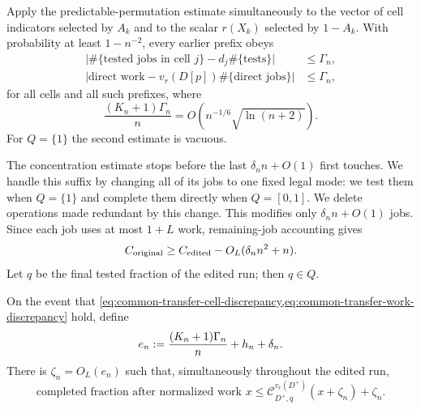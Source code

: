 Apply the predictable-permutation estimate simultaneously to the vector of
cell indicators selected by $A_k$ and to the scalar $r(X_k)$ selected by
$1-A_k$.  With probability at least $1-n^{-2}$, every earlier prefix obeys
\begin{align}
 \bigl|\#\{\text{tested jobs in cell }j\}
      -d_j\#\{\text{tests}\}\bigr|&\le\Gamma_n,
 \label{eq:common-transfer-cell-discrepancy}\\
 \bigl|\text{direct work}
      -v_r(D[p])\#\{\text{direct jobs}\}\bigr|&\le\Gamma_n,
 \label{eq:common-transfer-work-discrepancy}
\end{align}
for all cells and all such prefixes, where
\begin{equation}
 \frac{(K_n+1)\Gamma_n}{n}
 =O\!\left(n^{-1/6}\sqrt{\ln(n+2)}\right).
 \label{eq:common-transfer-discrepancy-rate}
\end{equation}
For $Q=\{1\}$ the second estimate is vacuous.

The concentration estimate stops before the last $\delta_n n+O(1)$ first
touches.  We handle this suffix by changing all of its jobs to one fixed
legal mode: we test them when $Q=\{1\}$ and complete them directly when
$Q=[0,1]$.  We delete operations made redundant by this change.  This
modifies only $\delta_n n+O(1)$ jobs.  Since each job uses at most $1+L$
work, remaining-job accounting gives
\begin{equation}
 C_{\rm original}\ge C_{\rm edited}
   -O_L(\delta_n n^2+n).
 \label{eq:common-transfer-suffix-edit}
\end{equation}
Let $q$ be the final tested fraction of the edited run; then $q\in Q$.

\begin{claim}
\label{clm:common-envelope-repair}
On the event that
\cref{eq:common-transfer-cell-discrepancy,eq:common-transfer-work-discrepancy}
hold, define
\begin{equation}
 e_n\mathrel{:=}\frac{(K_n+1)\Gamma_n}{n}+h_n+\delta_n.
 \label{eq:common-transfer-zeta}
\end{equation}
There is $\zeta_n=O_L(e_n)$ such that, simultaneously throughout the edited
run,
\begin{equation}
 \text{completed fraction after normalized work }x
 \le \mathcal C^{v_r(D^+)}_{D^+,q}(x+\zeta_n)+\zeta_n.
 \label{eq:common-transfer-envelope-repair}
\end{equation}
\end{claim}

